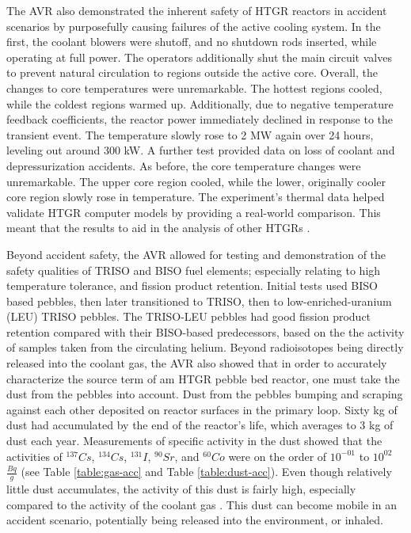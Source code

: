 The AVR also demonstrated the inherent safety of HTGR reactors in accident scenarios by purposefully causing failures of the active cooling system.  In the first, the coolant blowers were shutoff, and no shutdown rods inserted, while operating at full power.  The operators additionally shut the main circuit valves to prevent natural circulation to regions outside the active core.  Overall, the changes to core temperatures were unremarkable.  The hottest regions cooled, while the coldest regions warmed up.  Additionally, due to negative temperature feedback coefficients, the reactor power immediately declined in response to the transient event.  The temperature slowly rose to 2 MW again over 24 hours, leveling out around 300 kW.  A further test provided data on loss of coolant and depressurization accidents.  As before, the core temperature changes were unremarkable.  The upper core region cooled, while the lower, originally cooler core region slowly rose in temperature.  The experiment's thermal data helped validate HTGR computer models by providing a real-world comparison.  This meant that the results to aid in the analysis of other HTGRs \cite{gottaut_results_1990}.

Beyond accident safety, the AVR allowed for testing and demonstration of the safety qualities of TRISO and BISO fuel elements; especially relating to high temperature tolerance, and fission product retention.  Initial tests used BISO based pebbles, then later transitioned to TRISO, then to low-enriched-uranium (LEU) TRISO pebbles.  The TRISO-LEU pebbles had good fission product retention compared with their BISO-based predecessors, based on the the activity of samples taken from the circulating helium.  Beyond radioisotopes being directly released into the coolant gas, the AVR also showed that in order to accurately characterize the source term of am HTGR pebble bed reactor, one must take the dust from the pebbles into account.  Dust from the pebbles bumping and scraping against each other deposited on reactor surfaces in the primary loop.  Sixty kg of dust had accumulated by the end of the reactor's life, which averages to 3 kg of dust each year.  Measurements of specific activity in the dust showed that the activities of $^{137}Cs$, $^{134}Cs$, $^{131}I$, $^{90}Sr$, and $^{60}Co$ were on the order of $10^{-01}$ to $10^{02}$ $\frac{Bq}{g}$ (see Table \ref{table:gas-acc} and Table \ref{table:dust-acc}).  Even though relatively little dust accumulates, the activity of this dust is fairly high, especially compared to the activity of the coolant gas \cite{gottaut_results_1990}.  This dust can become mobile in an accident scenario, potentially being released into the environment, or inhaled.

